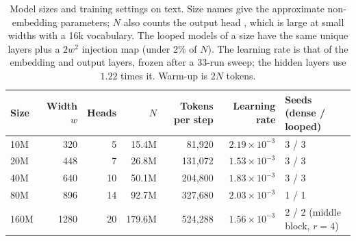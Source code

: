 \begin{table}[h]
  \centering
  \caption{Model sizes and training settings on text. Size names give the approximate non-embedding parameters; $N$
  also counts the output head \citep{porian2024resolving}, which is large at small widths with a 16k vocabulary. The
  looped models of a size have the same unique layers plus a $2w^2$ injection map (under 2\% of $N$). The learning rate is that of the embedding and output layers, frozen after a
  33-run sweep; the hidden layers use $1.22$ times it. Warm-up is $2N$ tokens.}
  \label{tab:sizes}
  \small
  \begin{tabular}{lrrrrrl}
    \toprule
    Size & Width $w$ & Heads & $N$ & Tokens per step & Learning rate & Seeds (dense / looped) \\
    \midrule
    10M  & 320  & 5  & 15.4M  & 81,920  & $2.19\times10^{-3}$ & 3 / 3 \\
    20M  & 448  & 7  & 26.8M  & 131,072 & $1.53\times10^{-3}$ & 3 / 3 \\
    40M  & 640  & 10 & 50.1M  & 204,800 & $1.83\times10^{-3}$ & 3 / 3 \\
    80M  & 896  & 14 & 92.7M  & 327,680 & $2.03\times10^{-3}$ & 1 / 1 \\
    160M & 1280 & 20 & 179.6M & 524,288 & $1.56\times10^{-3}$ & 2 / 2 (middle block, $r=4$) \\
    \bottomrule
  \end{tabular}
\end{table}

